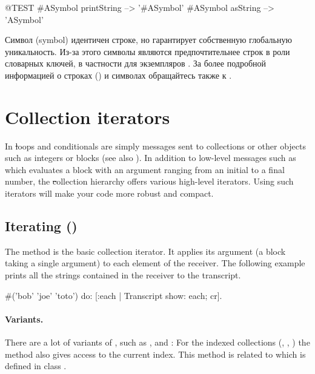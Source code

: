 \documentclass[a4paper,10pt,twoside]{book}
\begin{document}
\begin{code}{@TEST}
#ASymbol printString --> '#ASymbol'
#ASymbol asString    --> 'ASymbol'
\end{code}

Символ (symbol) идентичен строке, но гарантирует собственную глобальную уникальность. Из-за этого символы являются предпочтительнее строк в роли словарных ключей, в частности для экземпляров .
За более подробной информацией о строках () и символах  обращайтесь также к .

\section{Collection iterators}

In \st loops and conditionals are simply messages sent to collections or other objects such as integers or blocks (see also ). In addition to low-level messages such as  which evaluates a block with an argument ranging from an initial to a final number, the \st collection hierarchy offers various high-level iterators. Using such iterators will make your code more robust and compact. 

\subsection{Iterating ()}
The method  is the basic collection iterator. It applies its argument (a block taking a single argument) to each element of the receiver.
The following example prints all the strings contained in the receiver to the transcript.

\begin{code}{}
#('bob' 'joe' 'toto') do: [:each | Transcript show: each; cr].
\end{code}

\paragraph{Variants.} There are a lot of variants of , such as \mbox{,} \mbox{} and :
For the indexed collections (, , ) the method  also gives access to the current index. This method is related to  which is defined in class .
\end{document}
